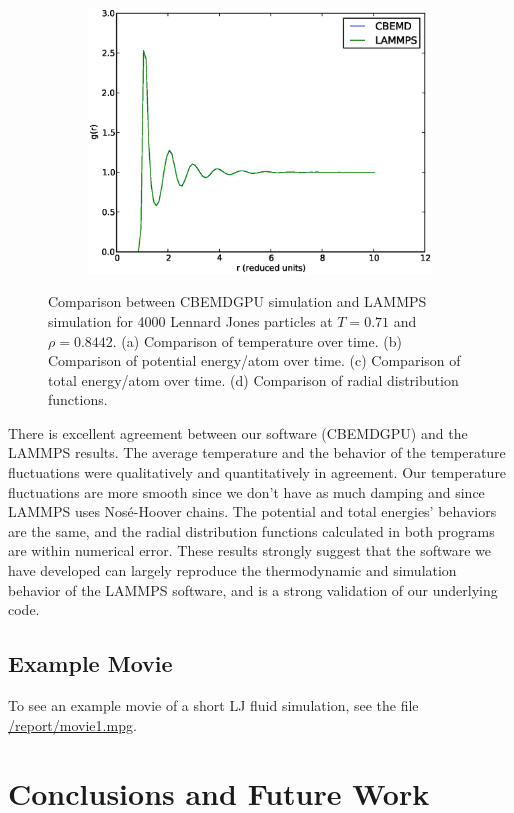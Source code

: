 \documentclass[12pt]{article}
\begin{document}
\begin{figure}[H]
\begin{subfigure}{0.5\textwidth}
	\caption{}
	\end{subfigure}
	\begin{subfigure}{0.5\textwidth}
	\includegraphics[width=\textwidth]{gr_compare}
	\caption{}
	\end{subfigure}
	\caption{Comparison between CBEMDGPU simulation and LAMMPS simulation for 4000 Lennard Jones particles at $T=0.71$ and $\rho=0.8442$. (a) Comparison of temperature over time. (b) Comparison of potential energy/atom over time. (c) Comparison of total energy/atom over time. (d) Comparison of radial distribution functions. }
	\label{fig:lmp_compare}
\end{figure}

There is excellent agreement between our software (CBEMDGPU) and the LAMMPS results. The average temperature and the behavior of the temperature fluctuations were qualitatively and quantitatively in agreement. Our temperature fluctuations are more smooth since we don't have as much damping and since LAMMPS uses Nos\'{e}-Hoover chains. The potential and total energies' behaviors are the same, and the radial distribution functions calculated in both programs are within numerical error. These results strongly suggest that the software we have developed can largely reproduce the thermodynamic and simulation behavior of the LAMMPS software, and is a strong validation of our underlying code.

\subsection{Example Movie}
To see an example movie of a short LJ fluid simulation, see the file \url{/report/movie1.mpg}.
\section{Conclusions and Future Work}

\pagebreak


\end{document}
